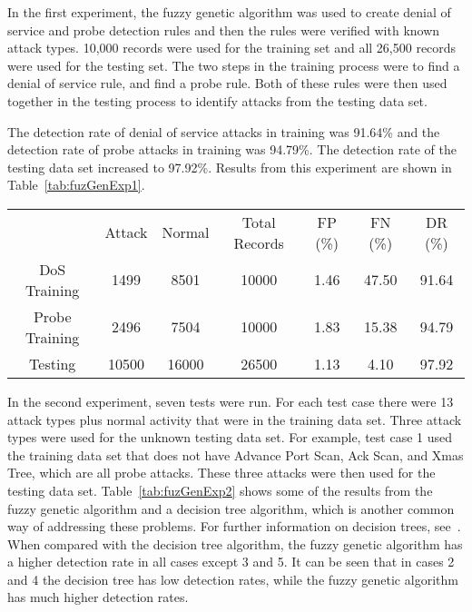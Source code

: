 \documentclass{sig-alternate}
\begin{document}
In the first experiment, the fuzzy genetic algorithm was used to create denial of service and probe detection rules and then the rules were verified with known attack types. 10,000 records were used for the training set and all 26,500 records were used for the testing set. The two steps in the training process were to find a denial of service rule, and find a probe rule. Both of these rules were then used together in the testing process to identify attacks from the testing data set.

The detection rate of denial of service attacks in training was 91.64\% and the detection rate of probe attacks in training was 94.79\%. The detection rate of the testing data set increased to 97.92\%. Results from this experiment are shown in Table~\ref{tab:fuzGenExp1}.

\begin{table*}
\center
\caption{Results from Experiment 1}
\vspace{0.20cm}
\begin{tabular}{ccccccc}
 & Attack & Normal & Total Records & FP (\%) & FN (\%) & DR (\%)\\
DoS Training & 1499 & 8501 & 10000 & 1.46 & 47.50 & 91.64\\
Probe Training & 2496 & 7504 & 10000 & 1.83 & 15.38 & 94.79\\
Testing & 10500 & 16000 & 26500 & 1.13 & 4.10 & 97.92\\
\end{tabular}
\label{tab:fuzGenExp1}
\center
\end{table*}

In the second experiment, seven tests were run. For each test case there were 13 attack types plus normal activity that were in the training data set. Three attack types were used for the unknown testing data set. For example, test case 1 used the training data set that does not have Advance Port Scan, Ack Scan, and Xmas Tree, which are all probe attacks. These three attacks were then used for the testing data set. Table~\ref{tab:fuzGenExp2} shows some of the results from the fuzzy genetic algorithm and a decision tree algorithm, which is another common way of addressing these problems. For further information on decision trees, see~\cite{decisionTree}. When compared with the decision tree algorithm, the fuzzy genetic algorithm has a higher detection rate in all cases except 3 and 5. It can be seen that in cases 2 and 4 the decision tree has low detection rates, while the fuzzy genetic algorithm has much higher detection rates.
\end{document}
